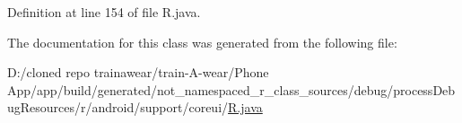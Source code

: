 Definition at line 154 of file R.\+java.



The documentation for this class was generated from the following file\+:\begin{DoxyCompactItemize}
\item 
D\+:/cloned repo trainawear/train-\/\+A-\/wear/\+Phone App/app/build/generated/not\+\_\+namespaced\+\_\+r\+\_\+class\+\_\+sources/debug/process\+Debug\+Resources/r/android/support/coreui/\mbox{\hyperlink{process_debug_resources_2r_2android_2support_2coreui_2_r_8java}{R.\+java}}\end{DoxyCompactItemize}
